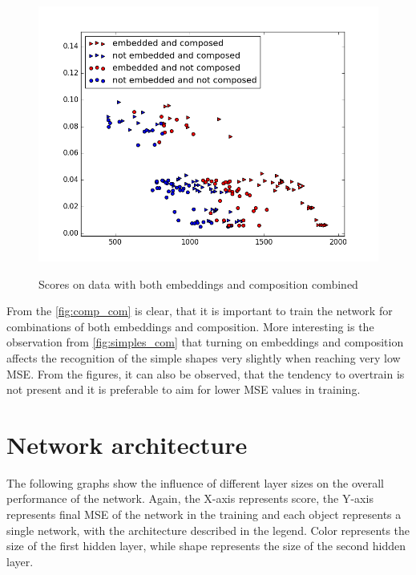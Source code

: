\begin{description}
\begin{figure}[!htb]
\begin{center}
\label{fig:x_com}
\includegraphics[width=\linewidth]{ext/figure_x_com.png}
\end{center}
    \centering
    \caption{Scores on data with both embeddings and composition combined}
\end{figure}

From the \ref{fig:comp_com} is clear, that it is important to train the network for combinations of both embeddings and composition. More interesting is the observation from \ref{fig:simples_com} that turning on embeddings and composition affects the recognition of the simple shapes very slightly when reaching very low MSE. From the figures, it can also be observed, that the tendency to overtrain is not present and it is preferable to aim for lower MSE values in training.

\section{Network architecture}
The following graphs show the influence of different layer sizes on the overall performance of the network. Again, the X-axis represents score, the Y-axis represents final MSE of the network in the training and each object represents a single network, with the architecture described in the legend. Color represents the size of the first hidden layer, while shape represents the size of the second hidden layer.


\end{description}
